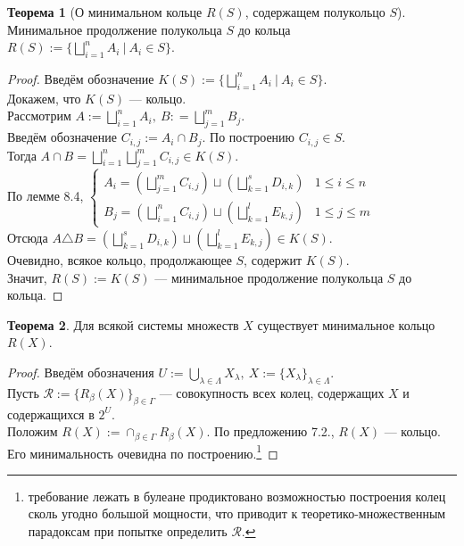 \documentclass[11pt,a4paper]{report}
\theoremstyle{definition}
\theoremstyle{definition}
\newtheorem{theorem}{Теорема}[section]
\theoremstyle{definition}
\begin{document}
	\begin{theorem}[О минимальном кольце $ R(S) $, содержащем полукольцо $ S $]$  $\\
		Минимальное продолжение полукольца $ S $ до кольца $ R(S) := \{\bigsqcup_{i=1}^{n} A_{i}\ |\ A_{i} \in S \} $.
	\end{theorem}
	\begin{proof}
		Введём обозначение $ K(S) := \{\bigsqcup_{i=1}^{n} A_{i}\ |\ A_{i} \in S \} $.\\ 
		Докажем, что $ K(S) $ — кольцо.\\
		Рассмотрим $ A := \bigsqcup_{i=1}^{n}{A_{i}},\ B : = \bigsqcup_{j=1}^{m}{B_{j}} $.\\
		Введём обозначение $ C_{i,j} := A_{i} \cap B_{j} $. По построению $ C_{i,j} \in S $.\\
		Тогда $ A \cap B = \bigsqcup_{i=1}^{n}\bigsqcup_{j=1}^{m}{C_{i,j}} \in K(S) $.\\
		По лемме 8.4, 
 		$ \begin{cases} 
			 A_{i} = (\bigsqcup_{j=1}^{m}{C_{i, j}}) \sqcup (\bigsqcup_{k=1}^{s}D_{i, k})  &  1 \le i \le n \\
			 B_{j} = (\bigsqcup_{i=1}^{n}{C_{i, j}}) \sqcup (\bigsqcup_{k=1}^{l}E_{k, j})  &  1 \le j \le m 
		\end{cases} $\\
		Отсюда $ A \triangle B = (\bigsqcup_{k=1}^{s}D_{i, k}) \sqcup (\bigsqcup_{k=1}^{l}E_{k, j}) \in K(S) $.\\
		Очевидно, всякое кольцо, продолжающее $ S $, содержит $ K(S) $.\\
		Значит, $ R(S) := K(S) $ — минимальное продолжение полукольца $ S $ до кольца.
	\end{proof}
	\begin{theorem}
		Для всякой системы множеств $ X $ существует минимальное кольцо $ R(X) $.
	\end{theorem}
	\begin{proof}
		Введём обозначения $ U := \bigcup_{\lambda \in \Lambda}{X_{\lambda}},\ X :=  \{X_{\lambda}\}_{\lambda \in \Lambda} $.\\
		Пусть $ \mathcal{R} := \{R_{\beta}(X)\}_{\beta \in \Gamma} $ — совокупность всех колец, содержащих $ X $ и содержащихся в $ 2^{U} $.\\ Положим $ R(X) := \cap_{\beta \in \Gamma}R_{\beta}(X) $. По предложению 7.2., $ R(X) $ — кольцо.\\
		Его минимальность очевидна по построению.\footnote{требование лежать в булеане продиктовано возможностью построения колец сколь угодно большой мощности, что приводит к теоретико-множественным парадоксам при попытке определить $ \mathcal{R} $.}
	\end{proof}
\end{document}
